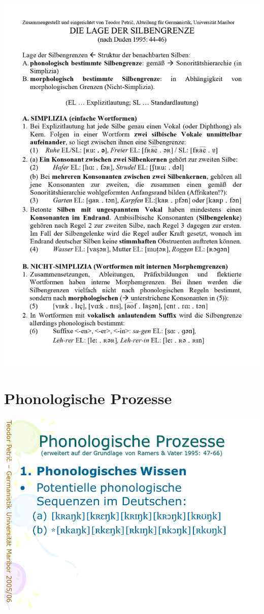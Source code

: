 \documentclass[
  letterpaper,
]{scrbook}
\begin{document}
\includegraphics[width=1\textwidth,height=\textheight]{./pictures/04_Die_Lage_der_Silbengrenze_page-0001.jpg}

\hypertarget{phonologische-prozesse}{%
\chapter{Phonologische Prozesse}\label{phonologische-prozesse}}

\includegraphics[width=1\textwidth,height=\textheight]{./pictures/prozesse/prozesse_2.PNG}
\end{document}

